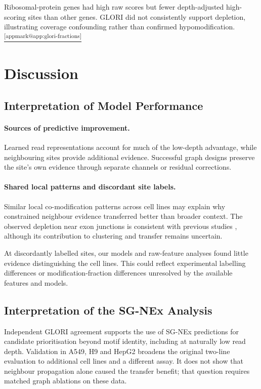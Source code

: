 \documentclass[11pt,a4paper]{article}
\makeatletter
\DeclareRobustCommand{\applink}[1]{%
    \hyperref[#1]{\textsuperscript{\ref*{appmark@#1}}}}
\makeatother
\begin{document}
Ribosomal-protein genes had high raw scores but fewer depth-adjusted
high-scoring sites than other genes. GLORI did not consistently support
depletion, illustrating coverage confounding rather than confirmed
hypomodification.
\applink{app:glori-fractions}

\section{Discussion}

\subsection{Interpretation of Model Performance}
\label{sec:disc-model}

\paragraph{Sources of predictive improvement.}
Learned read representations account for much of the
low-depth advantage, while neighbouring sites provide
additional evidence. Successful graph designs preserve
the site's own evidence through separate channels or
residual corrections.

\paragraph{Shared local patterns and discordant site labels.}
Similar local co-modification patterns across cell lines
may explain why constrained neighbour evidence transferred
better than broader context. The observed depletion near
exon junctions is consistent with previous studies
\citep{uzonyi2023,he2023}, although its contribution to
clustering and transfer remains uncertain.

At discordantly labelled sites, our models and raw-feature
analyses found little evidence distinguishing the cell
lines. This could reflect experimental labelling differences
or modification-fraction differences unresolved by the
available features and models.

\subsection{Interpretation of the SG-NEx Analysis}
Independent GLORI agreement supports the use of SG-NEx predictions for
candidate prioritisation beyond motif identity, including at naturally low
read depth. Validation in A549, H9 and HepG2 broadens the original two-line
evaluation to additional cell lines and a different assay. It does not show
that neighbour propagation alone caused the transfer benefit; that question
requires matched graph ablations on these data.
\end{document}

